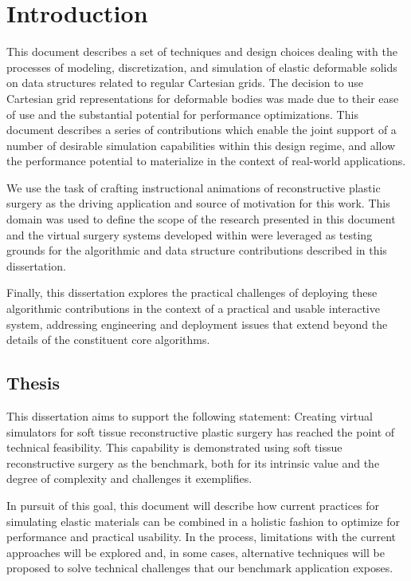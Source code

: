 \chapter{Introduction}

This document describes a set of techniques and design choices
dealing with the processes of modeling, discretization, and simulation
of elastic deformable solids on data structures related to regular
Cartesian grids. The decision to use Cartesian grid representations
for deformable bodies was made due to their ease of use and the
substantial potential for performance optimizations. This document
describes a series of contributions which enable the joint support of
a number of desirable simulation capabilities within this design
regime, and allow the performance potential to materialize in the
context of real-world applications.

We use the task of crafting instructional animations of reconstructive
plastic surgery as the driving application and source of motivation
for this work. This domain was used to define the scope of the
research presented in this document and the virtual surgery systems
developed within were leveraged as testing grounds for the algorithmic
and data structure contributions described in this dissertation.

Finally, this dissertation explores the practical challenges of
deploying these algorithmic contributions in the context of a
practical and usable interactive system, addressing engineering and
deployment issues that extend beyond the details of the constituent
core algorithms.

\section{Thesis}

This dissertation aims to support the following statement: Creating 
virtual simulators for soft tissue reconstructive plastic surgery has
reached the point of technical feasibility. This capability is
demonstrated using soft tissue reconstructive surgery as the
benchmark, both for its intrinsic value and the degree of complexity
and challenges it exemplifies.

In pursuit of this goal, this document will describe how current
practices for simulating elastic materials can be combined in a
holistic fashion to optimize for performance and practical
usability. In the process, limitations with the current approaches
will be explored and, in some cases, alternative techniques will be
proposed to solve technical challenges that our benchmark application
exposes.


